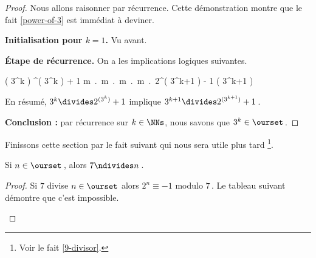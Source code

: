 \begin{proof}
	Nous allons raisonner par récurrence. Cette démonstration montre que le fait \ref{power-of-3} est immédiat à deviner.
    
    \medskip
    
    \textbf{Initialisation pour $k = 1$.}    
    Vu avant.
    
    
    \medskip
    
    \textbf{Étape de récurrence.}    
    On a les implications logiques suivantes.
    
    \medskip
    
    \begin{stepcalc}[style=ar*, ope=\implies]
    	( 3^k ) ^{( 3^k )} + 1
    \explnext{}
    	\exists m \in \ZZ \,.\, \Big[ 2^{( 3^k )} + 1 = m \cdot 3^k  \Big]
    \explnext{}
    	\exists m \in \ZZ \,.\, \Big[ 2^{( 3^k )} = - 1 + m \cdot 3^k  \Big]
    \explnext{}
    	\exists m \in \ZZ \,.\, \Big[ \big( 2^{( 3^k )} \big)^3 = \big( - 1 + m \cdot 3^k \big)^3  \Big]
    \explnext{}
    	\exists m \in \ZZ \,.\, \Big[ 2^{( 3^{k+1} )} = - 1 + 3 \cdot m \cdot 3^k - 3 \cdot \big( m \cdot 3^k \big)^2 + \big( m \cdot 3^k \big)^3  \Big]
    	2^{( 3^{k+1} )} \equiv - 1 \mod\!( 3^{k+1} )
    \end{stepcalc}
    
    \smallskip
    
    En résumé, 
    $3^k \divides 2^{( 3^k )} + 1$ 
    implique
    $3^{k+1} \divides 2^{( 3^{k+1} )} + 1$\,.
    
    \medskip
    
    \textbf{Conclusion :} par récurrence sur $k \in \NNs$, nous savons que $3^k \in \ourset$\,.
\end{proof}




Finissons cette section par le fait suivant qui nous sera utile plus tard
\footnote{
	Voir le fait \ref{9-divisor}.
}.

\begin{fact} \label{not-7-divisor}
	Si $n \in \ourset$\,, alors $7 \ndivides n$\,.
\end{fact}

\begin{proof}
	Si $7$ divise $n \in \ourset$ alors $2^n \equiv -1$ modulo $7$\,.
	Le tableau suivant démontre que c'est impossible.
	\begin{center}
	\end{center}

    \leavevmode
\end{proof}



